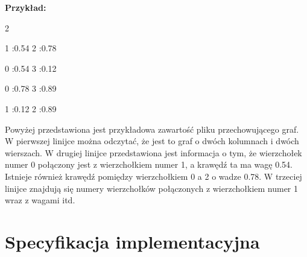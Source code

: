 \documentclass[11pt,a4paper]{report}
\newenvironment{multiconsole}{\begingroup\fontfamily{qcr}\selectfont}{\endgroup}
\begin{document}
    \vspace{1em}

    \noindent
    \textbf{Przykład:}

    \begin{multiconsole}
        2 2

        \hspace*{2em}1 :0.54  2 :0.78

        \hspace*{2em}0 :0.54  3 :0.12

        \hspace*{2em}0 :0.78  3 :0.89

        \hspace*{2em}1 :0.12  2 :0.89
    \end{multiconsole}

    Powyżej przedstawiona jest przykładowa zawartość pliku przechowującego graf. W pierwszej linijce można odczytać, że jest to graf o dwóch kolumnach i dwóch wierszach. W drugiej linijce przedstawiona jest informacja o tym, że wierzchołek numer 0 połączony jest z wierzchołkiem numer 1, a krawędź ta ma wagę 0.54. Istnieje również krawędź pomiędzy wierzchołkiem 0 a 2 o wadze 0.78. W trzeciej linijce znajdują się numery wierzchołków połączonych z wierzchołkiem numer 1 wraz z wagami itd.





    \newpage
    \chapter{Specyfikacja implementacyjna}

    \newpage
\end{document}
